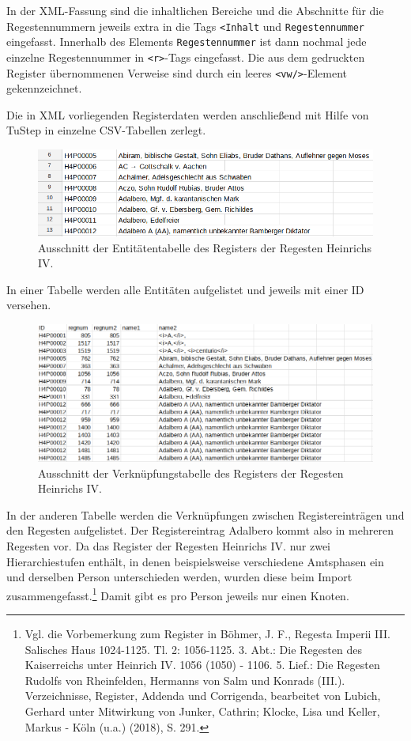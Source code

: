 \documentclass[ngerman,]{scrreprt}
\begin{document}
In der XML-Fassung sind die inhaltlichen Bereiche und die Abschnitte für die Regestennummern jeweils extra in die Tags \texttt{\textless{}Inhalt} und \texttt{Regestennummer} eingefasst. Innerhalb des Elements \texttt{Regestennummer} ist dann nochmal jede einzelne Regestennummer in \texttt{\textless{}r\textgreater{}}-Tags eingefasst. Die aus dem gedruckten Register übernommenen Verweise sind durch ein leeres \texttt{\textless{}vw/\textgreater{}}-Element gekennzeichnet.

Die in XML vorliegenden Registerdaten werden anschließend mit Hilfe von TuStep in einzelne CSV-Tabellen zerlegt.

\begin{figure}
\centering
\includegraphics{Bilder/RI2Graph/RegisterH4-Tabelle-Entitaeten.png}
\caption{Ausschnitt der Entitätentabelle des Registers der Regesten Heinrichs IV.}
\end{figure}

In einer Tabelle werden alle Entitäten aufgelistet und jeweils mit einer ID versehen.

\begin{figure}
\centering
\includegraphics{Bilder/RI2Graph/RegisterH4-GENANNT.png}
\caption{Ausschnitt der Verknüpfungstabelle des Registers der Regesten Heinrichs IV.}
\end{figure}

In der anderen Tabelle werden die Verknüpfungen zwischen Registereinträgen und den Regesten aufgelistet. Der Registereintrag Adalbero kommt also in mehreren Regesten vor. Da das Register der Regesten Heinrichs IV. nur zwei Hierarchiestufen enthält, in denen beispielsweise verschiedene Amtsphasen ein und derselben Person unterschieden werden, wurden diese beim Import zusammengefasst.\footnote{Vgl. die Vorbemerkung zum Register in Böhmer, J. F., Regesta Imperii III. Salisches Haus 1024-1125. Tl. 2: 1056-1125. 3. Abt.: Die Regesten des Kaiserreichs unter Heinrich IV. 1056 (1050) - 1106. 5. Lief.: Die Regesten Rudolfs von Rheinfelden, Hermanns von Salm und Konrads (III.). Verzeichnisse, Register, Addenda und Corrigenda, bearbeitet von Lubich, Gerhard unter Mitwirkung von Junker, Cathrin; Klocke, Lisa und Keller, Markus - Köln (u.a.) (2018), S. 291.} Damit gibt es pro Person jeweils nur einen Knoten.
\end{document}
